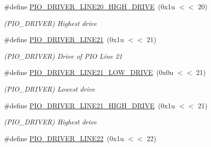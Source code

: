 \begin{DoxyCompactItemize}
\mbox{\label{group__SAMV71__PIO_ga9c2a87ff10c30c3519f5b76cce0a6563}} 
\#define \mbox{\hyperlink{group__SAMV71__PIO_ga9c2a87ff10c30c3519f5b76cce0a6563}{P\+I\+O\+\_\+\+D\+R\+I\+V\+E\+R\+\_\+\+L\+I\+N\+E20\+\_\+\+H\+I\+G\+H\+\_\+\+D\+R\+I\+VE}}~(0x1u $<$$<$ 20)
\begin{DoxyCompactList}\small\item\em (P\+I\+O\+\_\+\+D\+R\+I\+V\+ER) Highest drive \end{DoxyCompactList}\item 
\mbox{\label{group__SAMV71__PIO_gae63716a3b69625e917b1348071e12e6a}} 
\#define \mbox{\hyperlink{group__SAMV71__PIO_gae63716a3b69625e917b1348071e12e6a}{P\+I\+O\+\_\+\+D\+R\+I\+V\+E\+R\+\_\+\+L\+I\+N\+E21}}~(0x1u $<$$<$ 21)
\begin{DoxyCompactList}\small\item\em (P\+I\+O\+\_\+\+D\+R\+I\+V\+ER) Drive of P\+IO Line 21 \end{DoxyCompactList}\item 
\mbox{\label{group__SAMV71__PIO_ga65966cc49cfffff6df62f72a7b7b674f}} 
\#define \mbox{\hyperlink{group__SAMV71__PIO_ga65966cc49cfffff6df62f72a7b7b674f}{P\+I\+O\+\_\+\+D\+R\+I\+V\+E\+R\+\_\+\+L\+I\+N\+E21\+\_\+\+L\+O\+W\+\_\+\+D\+R\+I\+VE}}~(0x0u $<$$<$ 21)
\begin{DoxyCompactList}\small\item\em (P\+I\+O\+\_\+\+D\+R\+I\+V\+ER) Lowest drive \end{DoxyCompactList}\item 
\mbox{\label{group__SAMV71__PIO_ga08b034281dd12ea73bdde58e774fd905}} 
\#define \mbox{\hyperlink{group__SAMV71__PIO_ga08b034281dd12ea73bdde58e774fd905}{P\+I\+O\+\_\+\+D\+R\+I\+V\+E\+R\+\_\+\+L\+I\+N\+E21\+\_\+\+H\+I\+G\+H\+\_\+\+D\+R\+I\+VE}}~(0x1u $<$$<$ 21)
\begin{DoxyCompactList}\small\item\em (P\+I\+O\+\_\+\+D\+R\+I\+V\+ER) Highest drive \end{DoxyCompactList}\item 
\mbox{\label{group__SAMV71__PIO_ga254d2ab4da9b20775ed01b1da21d45ed}} 
\#define \mbox{\hyperlink{group__SAMV71__PIO_ga254d2ab4da9b20775ed01b1da21d45ed}{P\+I\+O\+\_\+\+D\+R\+I\+V\+E\+R\+\_\+\+L\+I\+N\+E22}}~(0x1u $<$$<$ 22)
$$
\end{DoxyCompactItemize}
